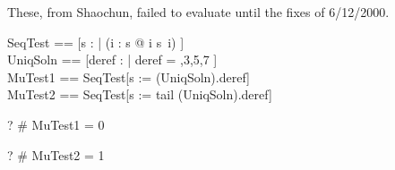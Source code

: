 \documentclass{article}
\begin{document}
These, from Shaochun, failed to evaluate until the fixes of 6/12/2000.
\begin{zed}
  SeqTest  == [s : \seq \nat | (\forall i : \dom s @ i \neq s~i) ] \\
  UniqSoln == [deref : \seq \nat | deref = ,3,5,7 \rangle] \\
  MuTest1  == SeqTest[s := (\mu UniqSoln).deref] \\
  MuTest2  == SeqTest[s := tail (\mu UniqSoln).deref]
\end{zed}

\begin{zed} \vdash? \# MuTest1 = 0 \end{zed}
\begin{zed} \vdash? \# MuTest2 = 1 \end{zed}
\end{document}
